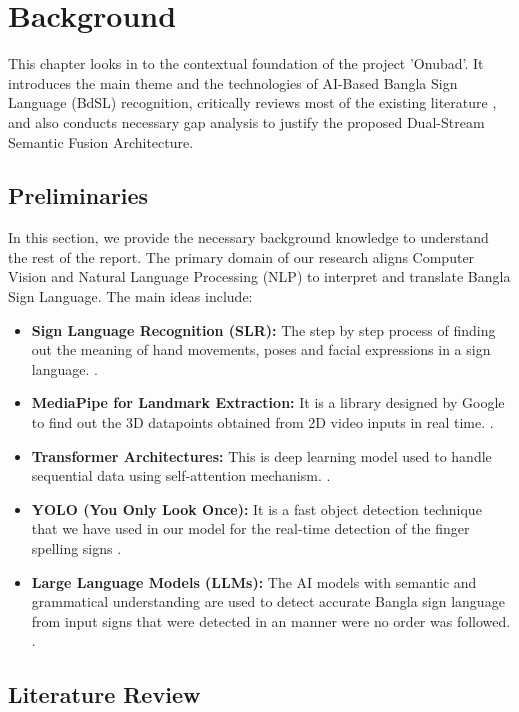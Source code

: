 \chapter{Background}

This chapter looks in to the contextual foundation of the project 'Onubad'. It introduces the main theme and the technologies of AI-Based Bangla Sign Language (BdSL) recognition, critically reviews most of the existing literature \cite{4, 55}, and also conducts necessary gap analysis to justify the proposed Dual-Stream Semantic Fusion Architecture.

\section{Preliminaries}

In this section, we provide the necessary background knowledge to understand the rest of the report. The primary domain of our research aligns Computer Vision and Natural Language Processing (NLP) to interpret and translate Bangla Sign Language. The main ideas include:

\begin{itemize}
    \item \textbf{Sign Language Recognition (SLR):} The step  by step process of finding out the meaning of hand movements, poses and facial expressions in a sign language. \cite{study_yolo_slr_2025}.
    \item \textbf{MediaPipe for Landmark Extraction:} It is a library designed by Google to find out the 3D datapoints obtained from 2D video inputs in real time. \cite{mediapipe_framework}.
    \item \textbf{Transformer Architectures:} This is deep learning model used to handle sequential data using self-attention mechanism. \cite{transformer_seq}.
    \item \textbf{YOLO (You Only Look Once):} It is a fast object detection technique that we have used in our model for the real-time detection of the finger spelling signs \cite{96, 97, yolo_nano_ref}.
    \item \textbf{Large Language Models (LLMs):} The AI models with semantic and grammatical understanding are used to detect accurate Bangla sign language from input signs that were detected in an manner were no order was followed. \cite{llm_reasoning_review}.
\end{itemize}

\section{Literature Review}

